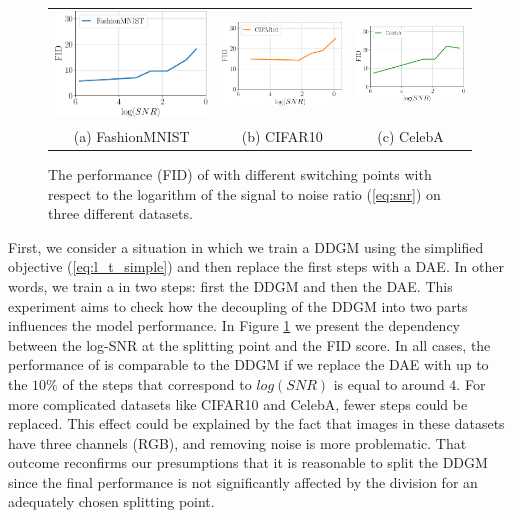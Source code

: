 \begin{figure}[t]
	\centering
	\begin{tabular}{ccc}
	    	\includegraphics[width=0.3\linewidth]{pics/4_daed/experiments/fid_snr_fmnist.pdf} & %
	     \includegraphics[width=0.3\linewidth]{pics/4_daed/experiments/fid_snr_cifar.pdf} & %
	      \includegraphics[width=0.3\linewidth]{pics/4_daed/experiments/fid_snr_celeba.pdf} \\ %
	    (a) FashionMNIST& (b) CIFAR10 & (c) CelebA 
	\end{tabular}
	\caption{ The performance (FID) of \ours{} with different switching points with respect to the logarithm of the signal to noise ratio (\protect\ref{eq:snr}) on three different datasets.}
	\label{fig:snr_fid}
	\vskip  -5pt
\end{figure}


First, we consider a situation in which we train a DDGM using the simplified objective (\ref{eq:l_t_simple}) and then replace the first steps with a DAE. In other words, we train a \ours{} in two steps: first the DDGM and then the DAE. This experiment aims to check how the decoupling of the DDGM into two parts influences the model performance. In Figure \ref{fig:snr_fid} we present the dependency between the log-SNR at the splitting point and the FID score. In all cases, the performance of \ours{} is comparable to the DDGM if we replace the DAE with up to the $10\%$ of the steps that correspond to $log(SNR)$ is equal to around $4$. For more complicated datasets like CIFAR10 and CelebA, fewer steps could be replaced. This effect could be explained by the fact that images in these datasets have three channels (RGB), and removing noise is more problematic. That outcome reconfirms our presumptions that it is reasonable to split the DDGM since the final performance is not significantly affected by the division for an adequately chosen splitting point.

